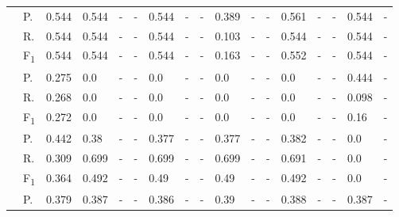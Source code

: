 \begin{tabularx}{\textwidth}{p{1.3em}l Z  Z  Z  Z  Z  Z  Z  Z  Z  Z  Z  Z  Z  Z  Z }
                     \midrule     {}
                & P.                     & 0.544  & 0.544  & -  & -  & 0.544  & -  & -  & 0.389  & -  & -  & 0.561  & -  & -  & 0.544  & -  \\
                & R.                     & 0.544     & 0.544     & -     & -     & 0.544     & -     & -     & 0.103     & -     & -     & 0.544     & -     & -     & 0.544     & -     \\
                & F\textsubscript{1}     & 0.544         & 0.544         & -         & -         & 0.544         & -         & -         & 0.163         & -         & -         & 0.552         & -         & -         & 0.544         & -         \\
                     \midrule     {}
                & P.                     & 0.275  & 0.0  & -  & -  & 0.0  & -  & -  & 0.0  & -  & -  & 0.0  & -  & -  & 0.444  & -  \\
                & R.                     & 0.268     & 0.0     & -     & -     & 0.0     & -     & -     & 0.0     & -     & -     & 0.0     & -     & -     & 0.098     & -     \\
                & F\textsubscript{1}     & 0.272         & 0.0         & -         & -         & 0.0         & -         & -         & 0.0         & -         & -         & 0.0         & -         & -         & 0.16         & -         \\
                     \midrule     {}
                & P.                     & 0.442  & 0.38  & -  & -  & 0.377  & -  & -  & 0.377  & -  & -  & 0.382  & -  & -  & 0.0  & -  \\
                & R.                     & 0.309     & 0.699     & -     & -     & 0.699     & -     & -     & 0.699     & -     & -     & 0.691     & -     & -     & 0.0     & -     \\
                & F\textsubscript{1}     & 0.364         & 0.492         & -         & -         & 0.49         & -         & -         & 0.49         & -         & -         & 0.492         & -         & -         & 0.0         & -         \\
                     \midrule     {}
                & P.                     & 0.379  & 0.387  & -  & -  & 0.386  & -  & -  & 0.39  & -  & -  & 0.388  & -  & -  & 0.387  & -  \\

\end{tabularx}
